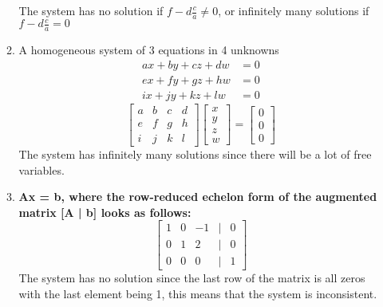 \documentclass[11pt]{article}
\begin{document}
\begin{enumerate}
\begin{enumerate}
    The system has no solution if \(f - d\frac{c}{a} \neq 0\), or infinitely many solutions if \(f - d\frac{c}{a} = 0\)
  
        
    \item A homogeneous system of 3 equations in 4 unknowns
    \[
        \begin{aligned}
            ax + by + cz + dw &= 0 \\
            ex + fy + gz + hw &= 0 \\
            ix + jy + kz + lw &= 0
        \end{aligned}
    \]
    \[
        \begin{bmatrix}
            a & b & c & d \\
            e & f & g & h \\
            i & j & k & l
        \end{bmatrix}
        \begin{bmatrix}
            x \\
            y \\
            z \\
            w
        \end{bmatrix}
        = \begin{bmatrix}
            0 \\
            0 \\
            0
        \end{bmatrix}
    \]
    The system has infinitely many solutions since there will be a lot of free variables.
    \item \textbf{Ax = b, where the row-reduced echelon form of the augmented matrix [A | b] looks as follows:}
    \[
        \begin{bmatrix}
            1 & 0 & -1 &|& 0 \\
            0 & 1 & 2 &|& 0 \\
            0 & 0 & 0 &|& 1
        \end{bmatrix}
    \]
    The system has no solution since the last row of the matrix is all zeros with the last element being 1, this means that the system is inconsistent.
\end{enumerate}


\end{enumerate}
\end{document}
